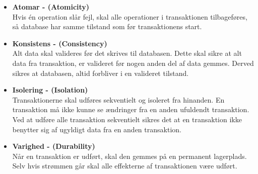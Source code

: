 \begin{itemize}
	\item \textbf{Atomar - (Atomicity)} \\
		Hvis én operation slår fejl, skal alle operationer i transaktionen tilbageføres, så database har samme tilstand som før transaktionens start. 

	\item \textbf{Konsistens - (Consistency)} \\
		Alt data skal valideres før det skrives til databasen. Dette skal sikre at alt data fra transaktion, er valideret før nogen anden del af data gemmes. Derved sikres at databasen, altid forbliver i en valideret tilstand.

	\item \textbf{Isolering - (Isolation)} \\
		Transaktionerne skal udføres sekventielt og isoleret fra hinanden. En transaktion må ikke kunne se ændringer fra en anden ufuldendt transaktion. Ved at udføre alle transaktion sekventielt sikres det at en transaktion ikke benytter sig af ugyldigt data fra en anden transaktion.

	\item \textbf{Varighed - (Durability)} \\
		Når en transaktion er udført, skal den gemmes på en permanent lagerplads. Selv hvis strømmen går skal alle effekterne af transaktionen være udført.
\end{itemize}

